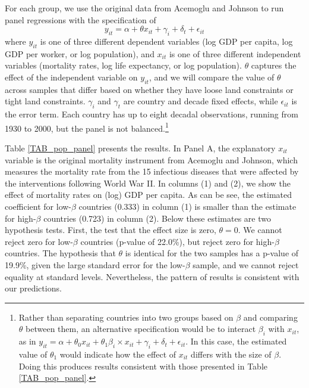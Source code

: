 \documentclass[11pt]{article}
\begin{document}
For each group, we use the original data from Acemoglu and Johnson to run panel regressions with the specification of
\begin{equation}
    y_{it} = \alpha + \theta x_{it} + \gamma_i + \delta_t + \epsilon_{it}
\end{equation}
where $y_{it}$ is one of three different dependent variables (log GDP per capita, log GDP per worker, or log population), and $x_{it}$ is one of three different independent variables (mortality rates, log life expectancy, or log population). $\theta$ captures the effect of the independent variable on $y_{it}$, and we will compare the value of $\theta$ across samples that differ based on whether they have loose land constraints or tight land constraints. $\gamma_i$ and $\gamma_t$ are country and decade fixed effects, while $\epsilon_{it}$ is the error term. Each country has up to eight decadal observations, running from 1930 to 2000, but the panel is not balanced.\footnote{Rather than separating countries into two groups based on $\beta$ and comparing $\theta$ between them, an alternative specification would be to interact $\beta_i$ with $x_{it}$, as in $y_{it} = \alpha + \theta_0 x_{it} + \theta_1 \beta_i \times x_{it} + \gamma_i + \delta_t + \epsilon_{it}$. In this case, the estimated value of $\theta_1$ would indicate how the effect of $x_{it}$ differs with the size of $\beta$. Doing this produces results consistent with those presented in Table \ref{TAB_pop_panel}.}

Table \ref{TAB_pop_panel} presents the results. In Panel A, the explanatory $x_{it}$ variable is the original mortality instrument from Acemoglu and Johnson, which measures the mortality rate from the 15 infectious diseases that were affected by the interventions following World War II. In columns (1) and (2), we show the effect of mortality rates on (log) GDP per capita. As can be see, the estimated coefficient for low-$\beta$ countries (0.333) in column (1) is smaller than the estimate for high-$\beta$ countries (0.723) in column (2). Below these estimates are two hypothesis tests. First, the test that the effect size is zero, $\theta=0$. We cannot reject zero for low-$\beta$ countries (p-value of 22.0\%), but reject zero for high-$\beta$ countries. The hypothesis that $\theta$ is identical for the two samples has a p-value of 19.9\%, given the large standard error for the low-$\beta$ sample, and we cannot reject equality at standard levels. Nevertheless, the pattern of results is consistent with our predictions.
\end{document}
